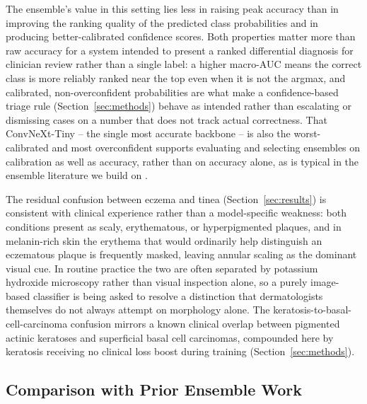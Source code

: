 \documentclass[VANCOUVER,twocolumn]{USG}
\begin{document}
The ensemble's value in this setting lies less in raising peak accuracy
than in improving the ranking quality of the predicted class probabilities
and in producing better-calibrated confidence scores. Both properties
matter more than raw accuracy for a system intended to present a ranked
differential diagnosis for clinician review rather than a single label: a
higher macro-AUC means the correct class is more reliably ranked near the
top even when it is not the argmax, and calibrated, non-overconfident
probabilities are what make a confidence-based triage rule
(Section~\ref{sec:methods}) behave as intended rather than escalating or
dismissing cases on a number that does not track actual correctness. That
ConvNeXt-Tiny -- the single most accurate backbone -- is also the
worst-calibrated and most overconfident supports evaluating and selecting
ensembles on calibration as well as accuracy, rather than on accuracy
alone, as is typical in the ensemble literature we build on
\cite{ref12,ref13,ref14,ref15,ref16,ref17}.

The residual confusion between eczema and tinea (Section~\ref{sec:results})
is consistent with clinical experience rather than a model-specific
weakness: both conditions present as scaly, erythematous, or
hyperpigmented plaques, and in melanin-rich skin the erythema that would
ordinarily help distinguish an eczematous plaque is frequently masked,
leaving annular scaling as the dominant visual cue. In routine practice the
two are often separated by potassium hydroxide microscopy rather than
visual inspection alone, so a purely image-based classifier is being asked
to resolve a distinction that dermatologists themselves do not always
attempt on morphology alone. The keratosis-to-basal-cell-carcinoma
confusion mirrors a known clinical overlap between pigmented actinic
keratoses and superficial basal cell carcinomas, compounded here by
keratosis receiving no clinical loss boost during training
(Section~\ref{sec:methods}).

\subsection{Comparison with Prior Ensemble Work}
\end{document}
